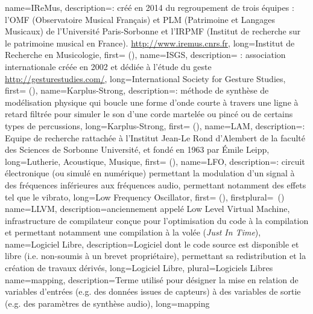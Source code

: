 {
    name={IReMus},
    description={\textit{}: créé en 2014 du regroupement de trois équipes : l'OMF (Observatoire Musical Français) et PLM (Patrimoine et Langages Musicaux) de l’Université Paris-Sorbonne et l’IRPMF (Institut de recherche sur le patrimoine musical en France). \url{http://www.iremus.cnrs.fr}},
    long={Institut de Recherche en Musicologie},
    first={} (),
}
{
    name={ISGS},
    description={\textit{} : association internationale créée en 2002 et dédiée à l'étude du geste \url{http://gesturestudies.com/}},
    long={International Society for Gesture Studies},
    first={} (),
}
{
    name={Karplus-Strong},
    description={\textit{}: méthode de synthèse de modélisation physique qui boucle une forme d'onde courte à travers une ligne à retard filtrée pour simuler le son d'une corde martelée ou pincé ou de certains types de percussions},
    long={Karplus-Strong},
    first={} (),
}
{
    name={LAM},
    description={\textit{}: Equipe de recherche rattachée à l'Institut Jean-Le Rond d'Alembert de la faculté des Sciences de Sorbonne Université, et fondé en 1963 par Émile Leipp},
    long={Lutherie, Acoustique, Musique},
    first={} (),
}
{
    name={LFO},
    description={\textit{}: circuit électronique (ou simulé en numérique) permettant la modulation d'un signal à des fréquences inférieures aux fréquences audio, permettant notamment des effets tel que le vibrato},
    long={Low Frequency Oscillator},
    first={} (),
    firstplural={\glspluralsuffix\ (\glspluralsuffix)}
}
{
    name={LLVM},
    description={anciennement appelé Low Level Virtual Machine, infrastructure de compilateur conçue pour l'optimisation du code à la compilation et permettant notamment une compilation à la volée (\textit{Just In Time})},
}
{
    name={Logiciel Libre},
    description={Logiciel dont le code source est disponible et libre (i.e. non-soumis à un brevet propriétaire), permettant sa redistribution et la création de travaux dérivés},
    long={Logiciel Libre},
    plural={Logiciels Libres}
}
{
    name={mapping},
    description={Terme utilisé pour désigner la mise en relation de variables d'entrées (e.g. des données issues de capteurs) à des variables de sortie (e.g. des paramètres de synthèse audio)},
    long={mapping}
}
